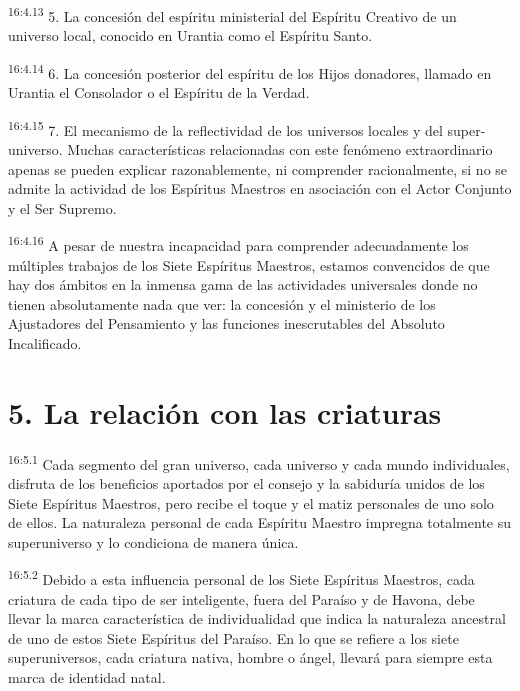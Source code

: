 \par
\textsuperscript{16:4.13} 5. La concesión del espíritu ministerial del Espíritu Creativo de un universo local, conocido en Urantia como el Espíritu Santo.

\par
\textsuperscript{16:4.14} 6. La concesión posterior del espíritu de los Hijos donadores, llamado en Urantia el Consolador o el Espíritu de la Verdad.

\par
\textsuperscript{16:4.15} 7. El mecanismo de la reflectividad de los universos locales y del super-universo. Muchas características relacionadas con este fenómeno extraordinario apenas se pueden explicar razonablemente, ni comprender racionalmente, si no se admite la actividad de los Espíritus Maestros en asociación con el Actor Conjunto y el Ser Supremo.

\par
\textsuperscript{16:4.16} A pesar de nuestra incapacidad para comprender adecuadamente los múltiples trabajos de los Siete Espíritus Maestros, estamos convencidos de que hay dos ámbitos en la inmensa gama de las actividades universales donde no tienen absolutamente nada que ver: la concesión y el ministerio de los Ajustadores del Pensamiento y las funciones inescrutables del Absoluto Incalificado.

\section*{5. La relación con las criaturas}
\par
\textsuperscript{16:5.1} Cada segmento del gran universo, cada universo y cada mundo individuales, disfruta de los beneficios aportados por el consejo y la sabiduría unidos de los Siete Espíritus Maestros, pero recibe el toque y el matiz personales de uno solo de ellos. La naturaleza personal de cada Espíritu Maestro impregna totalmente su superuniverso y lo condiciona de manera única.

\par
\textsuperscript{16:5.2} Debido a esta influencia personal de los Siete Espíritus Maestros, cada criatura de cada tipo de ser inteligente, fuera del Paraíso y de Havona, debe llevar la marca característica de individualidad que indica la naturaleza ancestral de uno de estos Siete Espíritus del Paraíso. En lo que se refiere a los siete superuniversos, cada criatura nativa, hombre o ángel, llevará para siempre esta marca de identidad natal.

